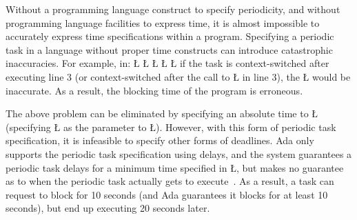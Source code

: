\documentclass[openright,twoside]{report}
\begin{document}
Without a programming language construct to specify periodicity, and without programming language facilities to express time, it is almost impossible to accurately express time specifications within a program.
Specifying a periodic task in a language without proper time constructs can introduce catastrophic inaccuracies.
For example, in:
{
\LGinlinefalse\LGbegin\lgrinde
\L{}
\L{\LB{}}
\CE{}\L{\LB{}}
\L{\LB{}}
\L{\LB{\}}}
\endlgrinde\LGend
}%
if the task is context-switched after executing line 3 (or context-switched after the call to \LGinlinetrue\LGbegin\lgrinde\L{}\endlgrinde\LGend{} in line 3), the \LGinlinetrue\LGbegin\lgrinde\L{}\endlgrinde\LGend{} would be inaccurate.
As a result, the blocking time of the program is erroneous.

The above problem can be eliminated by specifying an absolute time to \LGinlinetrue\LGbegin\lgrinde\L{}\endlgrinde\LGend{} (specifying \LGinlinetrue\LGbegin\lgrinde\L{}\endlgrinde\LGend{} as the parameter to \LGinlinetrue\LGbegin\lgrinde\L{}\endlgrinde\LGend{}).
However, with this form of periodic task specification, it is infeasible to specify other forms of deadlines.
Ada only supports the periodic task specification using delays, and the system guarantees a periodic task delays for a minimum time specified in \LGinlinetrue\LGbegin\lgrinde\L{}\endlgrinde\LGend{}, but makes no guarantee as to when the periodic task actually gets to execute~\cite{Baker91a}.
As a result, a task can request to block for 10 seconds (and Ada guarantees it blocks for at least 10 seconds), but end up executing 20 seconds later.
\end{document}
